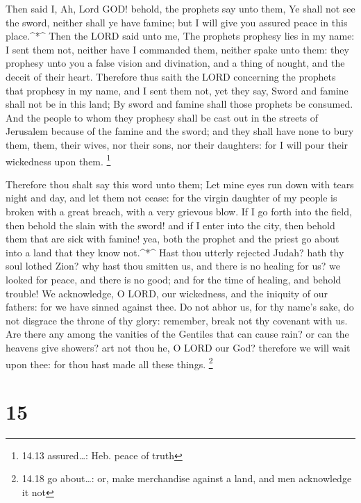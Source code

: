  Then said I, Ah, Lord GOD! behold, the prophets say unto
them, Ye shall not see the sword, neither shall ye have famine; but I
will give you assured peace in this place.\^{}*\^{}  Then
the LORD said unto me, The prophets prophesy lies in my name: I sent
them not, neither have I commanded them, neither spake unto them: they
prophesy unto you a false vision and divination, and a thing of nought,
and the deceit of their heart.  Therefore thus saith the
LORD concerning the prophets that prophesy in my name, and I sent them
not, yet they say, Sword and famine shall not be in this land; By sword
and famine shall those prophets be consumed.  And the
people to whom they prophesy shall be cast out in the streets of
Jerusalem because of the famine and the sword; and they shall have none
to bury them, them, their wives, nor their sons, nor their daughters:
for I will pour their wickedness upon them. \footnote{14.13
  assured\ldots: Heb. peace of truth}

 Therefore thou shalt say this word unto them; Let mine
eyes run down with tears night and day, and let them not cease: for the
virgin daughter of my people is broken with a great breach, with a very
grievous blow.  If I go forth into the field, then behold
the slain with the sword! and if I enter into the city, then behold them
that are sick with famine! yea, both the prophet and the priest go about
into a land that they know not.\^{}*\^{}  Hast thou utterly
rejected Judah? hath thy soul lothed Zion? why hast thou smitten us, and
there is no healing for us? we looked for peace, and there is no good;
and for the time of healing, and behold trouble!  We
acknowledge, O LORD, our wickedness, and the iniquity of our fathers:
for we have sinned against thee.  Do not abhor us, for thy
name's sake, do not disgrace the throne of thy glory: remember, break
not thy covenant with us.  Are there any among the vanities
of the Gentiles that can cause rain? or can the heavens give showers?
art not thou he, O LORD our God? therefore we will wait upon thee: for
thou hast made all these things. \footnote{14.18 go about\ldots: or,
  make merchandise against a land, and men acknowledge it not}

\hypertarget{section-14}{%
\section{15}\label{section-14}}

